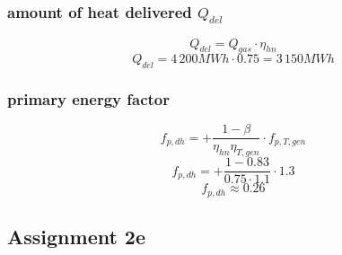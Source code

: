 \documentclass{article}
\begin{document}
		\subsubsection*{amount of heat delivered $Q_{del}$}
			$$Q_{del}=Q_{gas}\cdot \eta_{hn}$$
			$$Q_{del}=4\,200MWh\cdot 0.75 = 3\,150MWh$$
		\subsubsection*{primary energy factor}
			$$f_{p,dh}=+\frac{1-\beta}{\eta_{hn}\eta_{T,gen}}\cdot f_{p,T,gen}$$
			$$f_{p,dh}=+\frac{1-0.83}{0.75\cdot 1.1}\cdot 1.3$$
			$$f_{p,dh}\approx 0.26$$

	\newpage
	\subsection*{Assignment 2e}
\end{document}
